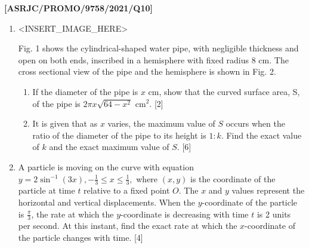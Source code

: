 \item \textbf{{[}ASRJC/PROMO/9758/2021/Q10{]} }
\begin{enumerate}
\item {}
\noindent \begin{center}
<INSERT\_IMAGE\_HERE>
\par\end{center}

Fig. 1 shows the cylindrical-shaped water pipe, with negligible thickness
and open on both ends, inscribed in a hemisphere with fixed radius
8 cm. The cross sectional view of the pipe and the hemisphere is shown
in Fig. 2. 
\begin{enumerate}
\item If the diameter of the pipe is $x$ cm, show that the curved surface
area, S, of the pipe is $2\pi x\sqrt{64-x^{2}}$ $\text{cm}^{2}$.
\hfill{}{[}2{]}
\item It is given that as $x$ varies, the maximum value of $S$ occurs
when the ratio of the diameter of the pipe to its height is $1:k$.
Find the exact value of $k$ and the exact maximum value of $S$.\hfill{}
{[}6{]}
\end{enumerate}
\item A particle is moving on the curve with equation $y=2\sin^{-1}(3x),-\frac{1}{3}\le x\le\frac{1}{3},$
where $(x,y)$ is the coordinate of the particle at time $t$ relative
to a fixed point $O$. The $x$ and $y$ values represent the horizontal
and vertical displacements. When the $y$-coordinate of the particle
is $\frac{\pi}{3}$, the rate at which the $y$-coordinate is decreasing
with time $t$ is 2 units per second. At this instant, find the exact
rate at which the $x$-coordinate of the particle changes with time.
\hfill{} {[}4{]}
\end{enumerate}